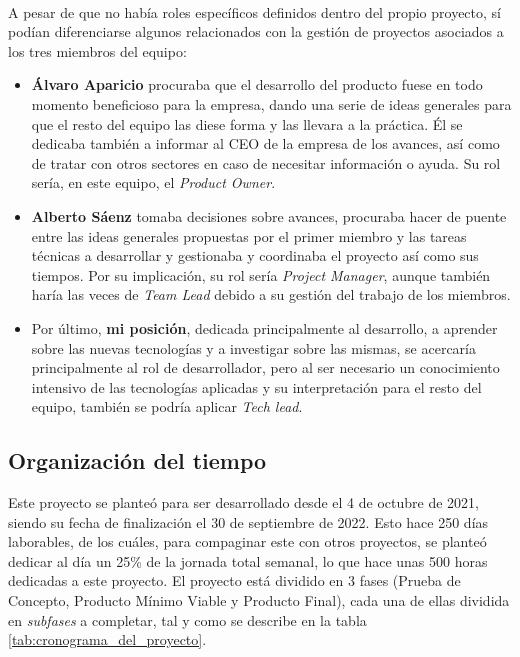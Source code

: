 \documentclass{subfiles}
\begin{document}
        \paragraph{}
        A pesar de que no había roles específicos definidos dentro del propio proyecto, sí podían diferenciarse algunos relacionados con la gestión de proyectos asociados a los tres miembros del equipo:
        \begin{itemize}
            \item \textbf{Álvaro Aparicio} procuraba que el desarrollo del producto fuese en todo momento beneficioso para la empresa, dando una serie de ideas generales para que el resto del equipo las diese forma y las llevara a la práctica. Él se dedicaba también a informar al CEO de la empresa de los avances, así como de tratar con otros sectores en caso de necesitar información o ayuda. Su rol sería, en este equipo, el \textit{Product Owner}.
            
            \item \textbf{Alberto Sáenz} tomaba decisiones sobre avances, procuraba hacer de puente entre las ideas generales propuestas por el primer miembro y las tareas técnicas a desarrollar y gestionaba y coordinaba el proyecto así como sus tiempos. Por su implicación, su rol sería \textit{Project Manager}, aunque también haría las veces de \textit{Team Lead} debido a su gestión del trabajo de los miembros.
            
            \item Por último, \textbf{mi posición}, dedicada principalmente al desarrollo, a aprender sobre las nuevas tecnologías y a investigar sobre las mismas, se acercaría principalmente al rol de desarrollador, pero al ser necesario un conocimiento intensivo de las tecnologías aplicadas y su interpretación para el resto del equipo, también se podría aplicar \textit{Tech lead}.
        \end{itemize}

        \subsection{Organización del tiempo}
        \label{sec:organizacion_del_tiempo}

        Este proyecto se planteó para ser desarrollado desde el 4 de octubre de 2021, siendo su fecha de finalización el 30 de septiembre de 2022. Esto hace 250 días laborables, de los cuáles, para compaginar este con otros proyectos, se planteó dedicar al día un 25\% de la jornada total semanal, lo que hace unas 500 horas dedicadas a este proyecto. El proyecto está dividido en 3 fases (Prueba de Concepto, Producto Mínimo Viable y Producto Final), cada una de ellas dividida en \textit{subfases} a completar, tal y como se describe en la tabla \ref{tab:cronograma_del_proyecto}.
\end{document}
